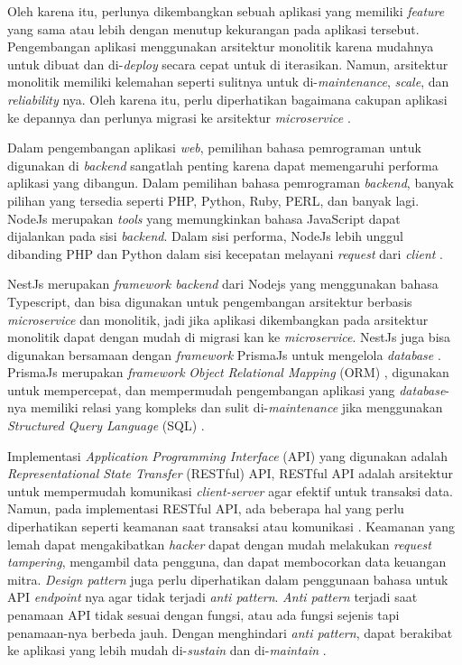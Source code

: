 Oleh karena itu, perlunya dikembangkan sebuah aplikasi yang memiliki \textit{feature} yang sama atau lebih dengan menutup kekurangan pada aplikasi tersebut. Pengembangan aplikasi menggunakan arsitektur monolitik karena mudahnya untuk dibuat dan di-\textit{deploy} secara cepat untuk di iterasikan. Namun, arsitektur monolitik memiliki kelemahan seperti sulitnya untuk di-\textit{maintenance}, \textit{scale}, dan \textit{reliability} nya. Oleh karena itu, perlu diperhatikan bagaimana cakupan aplikasi ke depannya dan perlunya migrasi ke arsitektur \textit{microservice} \cite{gos2020comparison} \cite{jatkiewicz2023differences}.

Dalam pengembangan aplikasi \textit{web}, pemilihan bahasa pemrograman untuk digunakan di \textit{backend} sangatlah penting karena dapat memengaruhi performa aplikasi yang dibangun. Dalam pemilihan bahasa pemrograman \textit{backend}, banyak pilihan yang tersedia seperti PHP, Python, Ruby, PERL, dan banyak lagi. NodeJs merupakan \textit{tools} yang memungkinkan bahasa JavaScript dapat dijalankan pada sisi \textit{backend}. Dalam sisi performa, NodeJs lebih unggul dibanding PHP dan Python dalam sisi kecepatan melayani \textit{request} dari \textit{client} \cite{William2020} \cite{Odeniran2023}.

NestJs merupakan \textit{framework backend} dari Nodejs yang menggunakan bahasa Typescript, dan bisa digunakan untuk pengembangan arsitektur berbasis \textit{microservice} dan monolitik, jadi jika aplikasi dikembangkan pada arsitektur monolitik dapat dengan mudah di migrasi kan ke \textit{microservice}. NestJs juga bisa digunakan bersamaan dengan \textit{framework} PrismaJs untuk mengelola \textit{database} \cite{NestJS}. PrismaJs merupakan \textit{framework} \textit{Object Relational Mapping} (ORM) \cite{Prisma}, digunakan untuk mempercepat, dan mempermudah pengembangan aplikasi yang \textit{database}-nya memiliki relasi yang kompleks dan sulit di-\textit{maintenance} jika menggunakan \textit{Structured Query Language} (SQL) \cite{Zmaranda2020}.

Implementasi \textit{Application Programming Interface} (API) yang digunakan adalah \textit{Representational State Transfer} (RESTful) API, RESTful API adalah arsitektur untuk mempermudah komunikasi \textit{client-server} agar efektif untuk transaksi data. Namun, pada implementasi RESTful API, ada beberapa hal yang perlu diperhatikan seperti keamanan saat transaksi  atau komunikasi \cite{Beer2018}. Keamanan yang lemah dapat mengakibatkan \textit{hacker} dapat dengan mudah melakukan \textit{request tampering}, mengambil data pengguna, dan dapat membocorkan data keuangan mitra. \textit{Design pattern} juga perlu diperhatikan dalam penggunaan bahasa untuk API \textit{endpoint} nya agar tidak terjadi \textit{anti pattern}. \textit{Anti pattern} terjadi saat penamaan API tidak sesuai dengan fungsi, atau ada fungsi sejenis tapi penamaan-nya berbeda jauh. Dengan menghindari \textit{anti pattern}, dapat berakibat ke aplikasi yang lebih mudah di-\textit{sustain} dan di-\textit{maintain} \cite{Aghajani2018} \cite{Alshraiedeh2021}.

